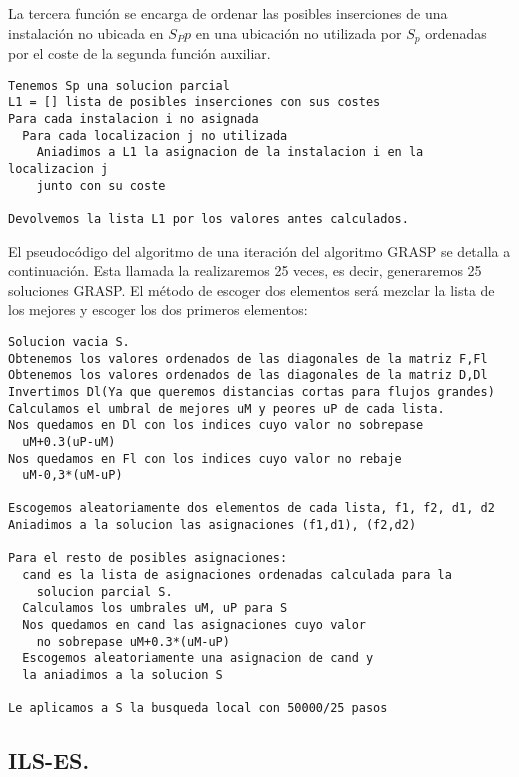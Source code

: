 \noindent\hrulefill


La tercera función se encarga de ordenar las posibles inserciones de una instalación  no ubicada en $S_Pp$ en una ubicación no utilizada por $S_p$ ordenadas por el coste de la segunda función auxiliar.

\noindent\hrulefill

\begin{lstlisting}
Tenemos Sp una solucion parcial
L1 = [] lista de posibles inserciones con sus costes
Para cada instalacion i no asignada
  Para cada localizacion j no utilizada
    Aniadimos a L1 la asignacion de la instalacion i en la localizacion j
    junto con su coste
    
Devolvemos la lista L1 por los valores antes calculados.
\end{lstlisting}


\noindent\hrulefill

El pseudocódigo del algoritmo de una iteración del algoritmo GRASP se detalla a continuación. Esta llamada la realizaremos 25 veces, es decir, generaremos 25 soluciones GRASP. El método de escoger dos elementos será mezclar la lista de los mejores y escoger los dos primeros elementos:\\

\noindent\hrulefill
\begin{lstlisting}
Solucion vacia S.
Obtenemos los valores ordenados de las diagonales de la matriz F,Fl
Obtenemos los valores ordenados de las diagonales de la matriz D,Dl
Invertimos Dl(Ya que queremos distancias cortas para flujos grandes)
Calculamos el umbral de mejores uM y peores uP de cada lista.
Nos quedamos en Dl con los indices cuyo valor no sobrepase
  uM+0.3(uP-uM)
Nos quedamos en Fl con los indices cuyo valor no rebaje
  uM-0,3*(uM-uP)

Escogemos aleatoriamente dos elementos de cada lista, f1, f2, d1, d2
Aniadimos a la solucion las asignaciones (f1,d1), (f2,d2)

Para el resto de posibles asignaciones:
  cand es la lista de asignaciones ordenadas calculada para la 
    solucion parcial S.
  Calculamos los umbrales uM, uP para S
  Nos quedamos en cand las asignaciones cuyo valor 
    no sobrepase uM+0.3*(uM-uP)
  Escogemos aleatoriamente una asignacion de cand y
  la aniadimos a la solucion S

Le aplicamos a S la busqueda local con 50000/25 pasos
\end{lstlisting}
\noindent\hrulefill

\subsection{ILS-ES.}

